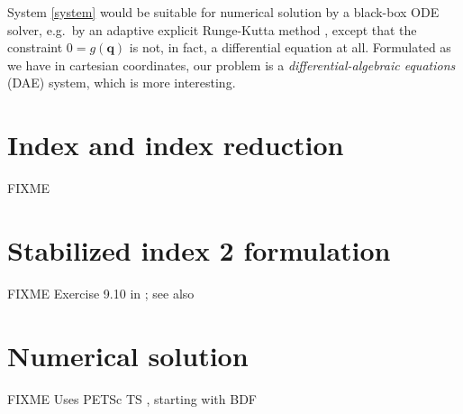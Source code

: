 \documentclass[letterpaper,final,12pt,reqno]{amsart}
\newcommand{\bq}{\mathbf{q}}
\begin{document}
System \eqref{system} would be suitable for numerical solution by a black-box ODE solver, e.g.~by an adaptive explicit Runge-Kutta method \cite{AscherPetzold1998}, except that the constraint $0=g(\bq)$ is not, in fact, a differential equation at all.  Formulated as we have in cartesian coordinates, our problem is a \emph{differential-algebraic equations} (DAE) system, which is more interesting.


\section{Index and index reduction}  FIXME


\section{Stabilized index 2 formulation}  FIXME Exercise 9.10 in \cite{AscherPetzold1998}; see also \cite{Gearetal1985}


\section{Numerical solution}

FIXME Uses PETSc TS \cite{Balayetal2021,Bueler2021}, starting with BDF

\small

\bigskip


\end{document}
